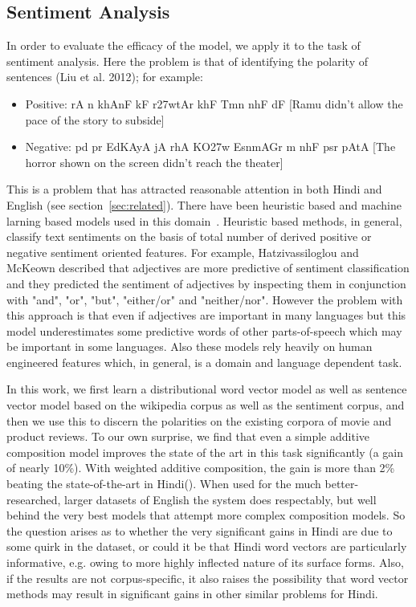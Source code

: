 \documentclass[11pt,a4paper]{article}
\begin{document}
\subsection{Sentiment Analysis}
In order to evaluate the efficacy of the model, we apply it to the task of sentiment analysis. Here the problem is that of identifying the polarity of sentences (Liu et al. 2012); for example: 
\begin{itemize}
\item Positive: {\dn rA n\? khAnF kF r\327wtAr khF{\qva} Tmn\? nhF{\qva} dF} [Ramu didn't allow the pace of the story to subside]
\item Negative: {\dn pd\?{\qvb} pr EdKAyA jA rhA KO\327w Esn\?mAGr m\?
nhF{\qva} psr pAtA} [The horror shown on the screen didn't reach the theater]
\end{itemize}

This is a problem that has attracted reasonable attention in both Hindi and English (see section~\ref{sec:related}). There have been heuristic based and machine larning based models used in this domain~\cite{Wang:14}. Heuristic based methods, in general, classify text sentiments on the basis of total number of derived positive or negative sentiment oriented features. For example, Hatzivassiloglou and McKeown \cite{Hatzivassiloglou:97} described that adjectives are more predictive of sentiment classification and they predicted the sentiment of adjectives by inspecting them in conjunction with "and", "or", "but", "either/or" and "neither/nor". However the problem with this approach is that even if adjectives  are important in many languages but this model underestimates some predictive words of other parts-of-speech which may be important in some languages. Also these models rely heavily on human engineered features which, in general, is a domain and language dependent task.

In this work, we first learn a distributional word vector model as well as sentence vector model based on the wikipedia corpus as well as the sentiment corpus, and then we use this to discern the polarities on the existing corpora of movie and product reviews. To our own surprise, we find that even a simple additive composition model improves the state of the art in this task significantly (a gain of nearly 10\%). With weighted additive composition, the gain is more than 2\% beating the state-of-the-art in Hindi(\cite{Singh:15}). When used for the much better-researched, larger datasets of English the system does respectably, but well behind the very best models that attempt more complex composition models. So the question arises as to whether the very significant gains in Hindi are due to some quirk in the dataset, or could it be that Hindi word vectors are particularly informative,
e.g. owing to more highly inflected nature of its surface forms.  Also, if the results are not corpus-specific, it also raises the possibility that word vector methods may result in significant gains in
other similar problems for Hindi. 
\end{document}
